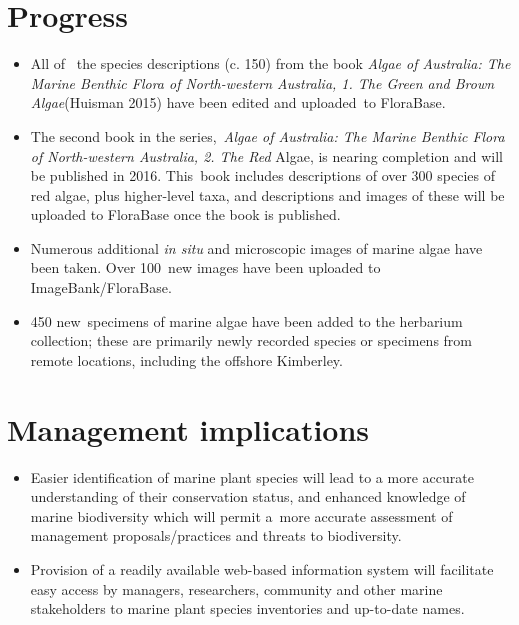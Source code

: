 \documentclass[version=last,
    paper=a4, %
    10pt, %
    usenames,
    dvipsnames,
    oneside, %
    headings=openany, %
    DIV=15 %
]{scrbook}
\begin{document}
\section*{Progress}
\begin{itemize}
\itemsep1pt\parskip0pt
\item
  All of ~the species descriptions (c. 150) from the book \emph{Algae of
  Australia: The Marine Benthic Flora of North-western Australia, 1. The
  Green and Brown Algae}(Huisman 2015) have been edited and uploaded~to
  FloraBase.
\item
  The second book in the series,~\emph{Algae of Australia: The Marine
  Benthic Flora of North-western Australia, 2. The Red} Algae, is
  nearing completion and will be published in 2016. This~book includes
  descriptions of over 300 species of red algae, plus higher-level taxa,
  and descriptions and images of these will be uploaded to FloraBase
  once the book is published.
\item
  Numerous additional \emph{in situ} and microscopic images of marine
  algae have been taken. Over 100~new images have been uploaded to
  ImageBank/FloraBase.
\item
  450 new~specimens of marine algae have been added to the herbarium
  collection; these are primarily newly recorded species or specimens
  from remote locations, including the offshore Kimberley.
\end{itemize}



\section*{Management implications}
\begin{itemize}
\itemsep1pt\parskip0pt
\item
  Easier identification of marine plant species will lead to a more
  accurate understanding of their conservation status, and enhanced
  knowledge of marine biodiversity which will permit a~more accurate
  assessment of management proposals/practices and threats to
  biodiversity.
\item
  Provision of a readily available web-based information system will
  facilitate easy access by managers, researchers, community and other
  marine stakeholders to marine plant species inventories and up-to-date
  names.
\end{itemize}
\end{document}
